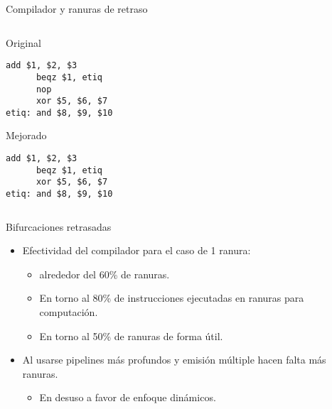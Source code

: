 \begin{frame}[t,fragile]{Compilador y ranuras de retraso}
\begin{columns}[T]
\begin{column}{.33\textwidth}
\begin{block}{Original}
\begin{lstlisting}[language={generalasm},basicstyle=\scriptsize]
      add $1, $2, $3
      beqz $1, etiq
      nop
      xor $5, $6, $7
etiq: and $8, $9, $10
\end{lstlisting}
\end{block}
\begin{block}{Mejorado}
\begin{lstlisting}[language={generalasm},basicstyle=\scriptsize]
      add $1, $2, $3
      beqz $1, etiq
      xor $5, $6, $7
etiq: and $8, $9, $10
\end{lstlisting}
\end{block}
\end{column}

\end{columns}
\end{frame}

\begin{frame}[t]{Bifurcaciones retrasadas}
\begin{itemize}
  \item Efectividad del compilador para el caso de 1 ranura:
    \begin{itemize}
      \item {} alrededor del 60\% de ranuras.
      \item En torno al 80\% de instrucciones ejecutadas en ranuras  para computación.
      \item En torno al 50\% de ranuras  de forma útil.
    \end{itemize}

  \item Al usarse pipelines más profundos y emisión múltiple hacen falta más ranuras.
    \begin{itemize}
      \item En desuso a favor de enfoque dinámicos.
    \end{itemize}
\end{itemize}
\end{frame}

